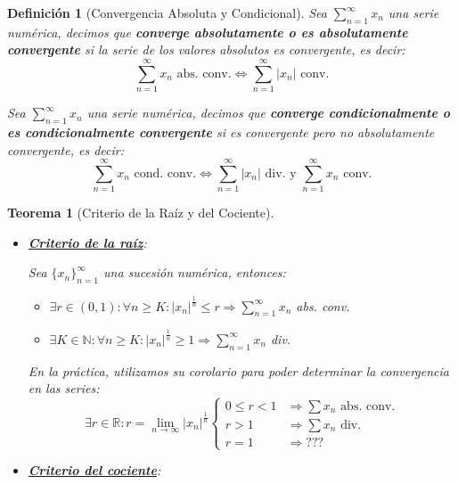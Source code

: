 \documentclass[10pt,a4paper,openright]{book}
\theoremstyle{break}
\newtheorem*{defi}{Definición}
\newtheorem*{theo}{Teorema}
\begin{document}
\begin{defi}[Convergencia Absoluta y Condicional]
Sea $\sum_{n = 1}^{\infty} x_n$ una serie numérica, decimos que \textbf{converge absolutamente o es absolutamente convergente} si la serie de los valores absolutos es convergente, es decir:
$$\sum_{n = 1}^{\infty} x_n\mbox{ abs. conv.} \Leftrightarrow \sum_{n=1}^{\infty} |x_n|\mbox{ conv.}$$

Sea $\sum_{n = 1}^{\infty} x_n$ una serie numérica, decimos que \textbf{converge condicionalmente o es condicionalmente convergente} si es convergente pero no absolutamente convergente, es decir:
$$\sum_{n = 1}^{\infty} x_n\mbox{ cond. conv.} \Leftrightarrow \sum_{n=1}^{\infty} |x_n|\mbox{ div. y } \sum_{n = 1}^{\infty} x_n \mbox{ conv.}$$
\end{defi}

\begin{theo}[Criterio de la Raíz y del Cociente]
\begin{itemize}
\item \underline{\textbf{Criterio de la raíz}}:

	Sea $\{x_n\}_{n=1}^\infty$ una sucesión numérica, entonces:
	\begin{itemize}
	\item $\exists r\in (0,1): \forall n\geq K: |x_n|^\frac{1}{n}\leq r \Rightarrow  \sum_{n=1}^{\infty} x_n$ abs. conv.
	\item $\exists K \in \mathbb N: \forall n\geq K: |x_n|^\frac{1}{n} \geq 1 \Rightarrow \sum_{n=1}^{\infty} x_n$ div.
	\end{itemize}
	En la práctica, utilizamos su corolario para poder determinar la convergencia en las series:
$$\exists r \in \mathbb R: r= \lim_{n \rightarrow \infty} |x_n|^{\frac{1}{n}} \begin{cases}
0 \leq r < 1 &\Rightarrow \sum x_n \mbox{ abs. conv.} \\ r>1 &\Rightarrow \sum x_n\mbox{ div.}\\ r=1 &\Rightarrow ???\end{cases}$$

	
\item \underline{\textbf{Criterio del cociente}}:
	

\end{itemize}
\end{theo}
\end{document}
